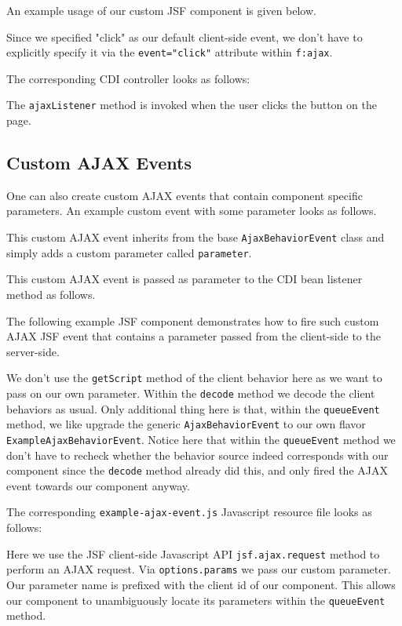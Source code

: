 An example usage of our custom JSF component is given below.

Since we specified "click" as our default client-side event, we don't have to explicitly specify it via the \texttt{event="click"} attribute within \texttt{f:ajax}.

The corresponding CDI controller looks as follows:

The \texttt{ajaxListener} method is invoked when the user clicks the button on the page.

\subsection{Custom AJAX Events}

One can also create custom AJAX events that contain component specific parameters.
An example custom event with some parameter looks as follows.

This custom AJAX event inherits from the base \texttt{AjaxBehaviorEvent} class and simply adds a custom parameter called \texttt{parameter}.

This custom AJAX event is passed as parameter to the CDI bean listener method as follows.


The following example JSF component demonstrates how to fire such custom AJAX JSF event that contains a parameter passed from the client-side to the server-side.

We don't use the \texttt{getScript} method of the client behavior here as we want to pass on our own parameter.
Within the \texttt{decode} method we decode the client behaviors as usual.
Only additional thing here is that, within the \texttt{queueEvent} method, we like upgrade the generic \texttt{AjaxBehaviorEvent} to our own flavor \texttt{ExampleAjaxBehaviorEvent}.
Notice here that within the \texttt{queueEvent} method we don't have to recheck whether the behavior source indeed corresponds with our component since the \texttt{decode} method already did this, and only fired the AJAX event towards our component anyway.

The corresponding \texttt{example-ajax-event.js} Javascript resource file looks as follows:

Here we use the JSF client-side Javascript API \texttt{jsf.ajax.request} method to perform an AJAX request.
Via \texttt{options.params} we pass our custom parameter.
Our parameter name is prefixed with the client id of our component.
This allows our component to unambiguously locate its parameters within the \texttt{queueEvent} method.

